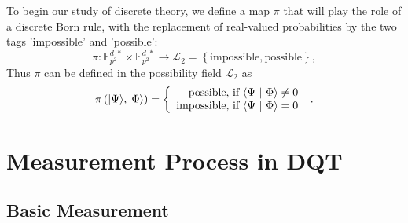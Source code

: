 \documentclass[english,12pt]{iopart}
\newcommand{\ip}[2]{\langle #1 ~|~ #2 \rangle}
\newcommand{\ffzd}[1]{{\mathbb{F}^{d\;*}_{#1}}}
\newcommand{\dpr}{{\pi}}
\newcommand{\amr}[1]{\fbox{\begin{minipage}{0.9\textwidth}\color{red}{Amr says: #1}\end{minipage}}}
\begin{document}
To begin our study of discrete theory, we define a map $\dpr $ that
will play the role of a discrete Born rule, with the replacement of
real-valued probabilities by the two tags 'impossible' and 'possible':
\[\dpr :\ffzd{p^{2}}\times\ffzd{p^{2}}\rightarrow\mathscr{L}_{2} = \left\{
\text{impossible},\text{possible}\right\} , \]
Thus $\dpr $ can be defined in the possibility field $\mathscr{L}_{2}$ 
as
\begin{equation}
\dpr \left(\ket{\Psi},\ket{\Phi}\right)=
\left\{ \begin{array}{r@{\textrm{, if }}l}
\textrm{possible} & \ip{\Psi}{\Phi}\ne 0\\
\textrm{impossible} & \ip{\Psi}{\Phi}=0
\end{array} \right. \ .
\label{eq:modality}
\end{equation}




\section{Measurement Process in DQT}

\subsection{Basic Measurement} 

\amr{Adapt the following to DQT}
\end{document}

